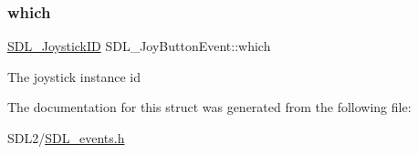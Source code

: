 \subsubsection{\texorpdfstring{which}{which}}
{\footnotesize\ttfamily \hyperlink{_s_d_l__joystick_8h_a3c3d32500cb08f76ee8077983912c0bd}{S\+D\+L\+\_\+\+Joystick\+ID} S\+D\+L\+\_\+\+Joy\+Button\+Event\+::which}

The joystick instance id 

The documentation for this struct was generated from the following file\+:\begin{DoxyCompactItemize}
\item 
S\+D\+L2/\hyperlink{_s_d_l__events_8h}{S\+D\+L\+\_\+events.\+h}\end{DoxyCompactItemize}
